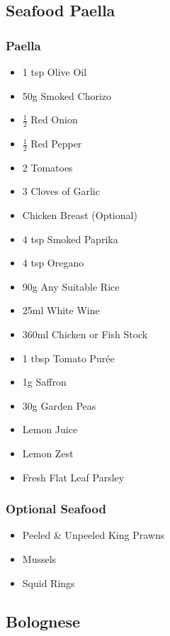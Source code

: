 \documentclass[11pt, english]{article}
\begin{document}
	\subsection{Seafood Paella}

		\subsubsection*{Paella}

	\begin{itemize}
        \setlength\itemsep{0cm}
                \item 1 tsp Olive Oil
		\item 50g Smoked Chorizo
		\item $\frac{1}{2}$ Red Onion
		\item $\frac{1}{2}$ Red Pepper
		\item 2 Tomatoes
		\item 3 Cloves of Garlic
		\item Chicken Breast (Optional)
		\item 4 tsp Smoked Paprika
		\item 4 tsp Oregano
		\item 90g Any Suitable Rice
		\item 25ml White Wine
		\item 360ml Chicken or Fish Stock
		\item 1 tbsp Tomato Pur\'{e}e
		\item 1g Saffron
		\item 30g Garden Peas
		\item Lemon Juice
		\item Lemon Zest
		\item Fresh Flat Leaf Parsley
        \end{itemize}

		\subsubsection*{Optional Seafood}

	\begin{itemize}
        \setlength\itemsep{0cm}
		\item Peeled \& Unpeeled King Prawns
		\item Mussels
		\item Squid Rings
        \end{itemize}

\newpage

	\subsection{Bolognese}
\end{document}
